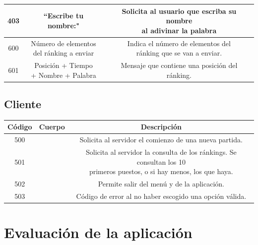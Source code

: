 \documentclass[11pt,a4paper]{article}
\begin{document}
\begin{center}
\begin{tabular}{| c | c | c |}
		403 & ``Escribe tu nombre:" & \makecell{Solicita al usuario que escriba su nombre\\al adivinar la palabra}\\ \hline
		600 & \makecell{Número de elementos\\del ránking a enviar} & \makecell{Indica el número de elementos del\\ ránking que se van a enviar.} \\ \hline
		601 & \makecell{Posición + Tiempo\\ + Nombre + Palabra} & \makecell{Mensaje que contiene una posición del\\ránking.} \\
		\hline
		\end{tabular}
		\end{center}
		\subsection{Cliente}
		\begin{center}
		\begin{tabular}{| c | c | c |}
		\hline
		\textbf{Código} & \textbf{Cuerpo} & \textbf{Descripción}\\ \hline
		500 & & Solicita al servidor el comienzo de una nueva partida. \\ \hline
		501 & & \makecell{Solicita al servidor la consulta de los ránkings. Se consultan los 10\\ primeros puestos, o si hay menos, los que haya.} \\ \hline
		502 & & Permite salir del menú y de la aplicación.\\ \hline
		503 & & Código de error al no haber escogido una opción válida.\\
		\hline
		\end{tabular}
		\end{center}

	\section{Evaluación de la aplicación}
	
\end{document}
